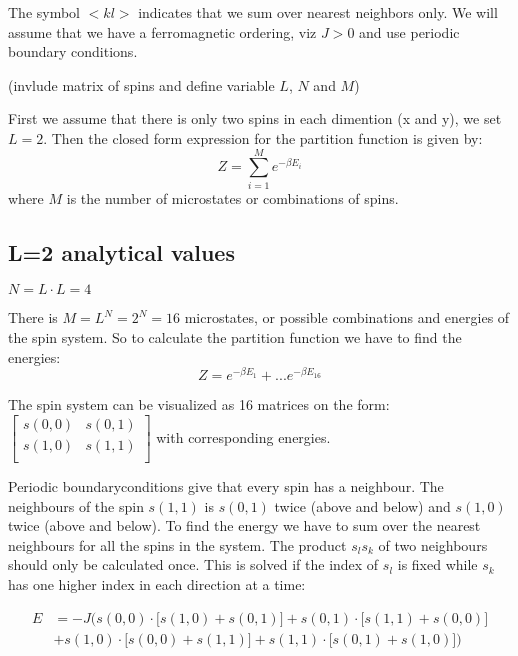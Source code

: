 \documentclass[11pt,a4wide]{article}
\begin{document}
The symbol $<kl>$ indicates that we sum over nearest neighbors only. We will assume that we have a ferromagnetic ordering, viz $J> 0$ and use periodic boundary conditions. 

(invlude matrix of spins and define variable $L$, $N$ and $M$)

First we assume that there is only two spins in each dimention (x and y), we set $L=2$. Then the closed form expression for the partition function is given by:
\[
Z = \sum_{i=1}^M e^{-\beta E_i}
\]
where $M$ is the number of microstates or combinations of spins.


\subsection{L=2 analytical values}

$N = L\cdot L = 4$

There is $M= L^N = 2^N = 16$ microstates, or possible combinations and energies of the spin system. So to calculate the partition function we have to find the energies:
\[
Z = e^{-\beta E_1} + ... e^{-\beta E_{16}}
\]

The spin system can be visualized as 16 matrices on the form:
$\left[ \begin{array}{cc} s(0,0) & s(0,1) \\
                             	    s(1,0)  & s(1,1) \\
\end{array} \right]$
with corresponding energies. 

Periodic boundaryconditions give that every spin has a neighbour. The neighbours of the spin $s(1,1)$ is  $s(0,1)$ twice (above and below) and $s(1,0)$ twice (above and below). To find the energy we have to sum over the nearest neighbours for all the spins in the system. The product $s_ls_k$ of two neighbours should only be calculated once. This is solved if the index of $s_l$ is fixed while $s_k$ has one higher index in each direction at a time:

\begin{align}
E &= -J\bigg( s(0,0)\cdot \big[s(1,0) + s(0,1) \big] + s(0,1)\cdot\big[s(1,1) + s(0,0) \big] \nonumber   \\ 
 &+ s(1,0)\cdot\big[s(0,0) + s(1,1) \big] + s(1,1)\cdot\big[s(0,1) + s(1,0) \big] \bigg)
 \label{eq: energy spins}
\end{align}
\end{document}
